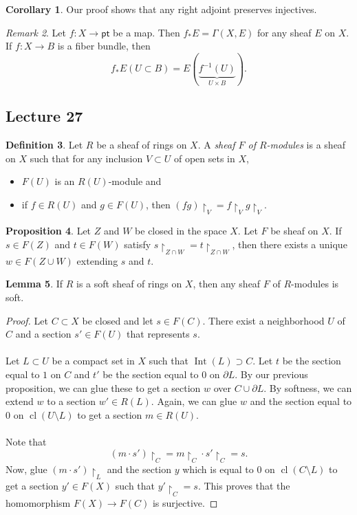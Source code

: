 \documentclass[10pt,letterpaper,cm]{nupset}
\theoremstyle{definition}
\newtheorem{definition}{Definition}[subsection]
\theoremstyle{theorem}
\newtheorem{lemma}[definition]{Lemma}
\newtheorem{prop}[definition]{Proposition}
\newtheorem{corollary}[definition]{Corollary}
\theoremstyle{remark}
\newtheorem{remark}[definition]{Remark}
\newcommand{\1}{\mathbb{1}}
\newcommand{\0}{\vec 0}
\newcommand{\pt}{\mathsf{pt}}
\DeclareMathOperator{\Int}{Int}
\DeclareMathOperator{\cl}{cl}
\begin{document}
\begin{corollary}
Our proof shows that any right adjoint preserves injectives. 
\end{corollary}

\begin{remark}
Let $f : X \to \pt$ be a map. Then $f_{\ast}{E} = \Gamma(X, E)$ for any sheaf $E$ on $X$. If $f : X \to B$ is a fiber bundle, then $$f_{\ast}{E}(U \subset B) = E(\underbrace{f^{-1}(U)}_{U \times B}).$$
\end{remark}

\subsection{Lecture 27}

\begin{definition}
Let $R$ be a sheaf of rings on $X$. A \textit{sheaf  $F$ of $R$-modules} is a sheaf on $X$ such that for any inclusion $V \subset U$ of open sets in $X$, 
\begin{itemize}
\item $F(U)$ is an $R(U)$-module and
\item if $f \in R(U)$ and $g \in F(U)$, then $(fg)\restriction_V = f\restriction_V g\restriction_V$.
\end{itemize}
\end{definition}


\begin{prop}
Let $Z$ and $W$ be closed in the space $X$. Let $F$ be sheaf on $X$. If $s\in F(Z)$ and $t \in F(W)$ satisfy $s \restriction_{Z \cap W} = t \restriction_{Z \cap W}$, then there exists a unique $w \in F(Z \cup W)$ extending $s$ and $t$.
\end{prop}

\begin{lemma}
If $R$ is a soft sheaf of rings on $X$, then any sheaf $F$ of $R$-modules is soft.
\end{lemma}
\begin{proof}
Let $C \subset X$ be closed and let $s \in F(C)$. There exist a neighborhood $U$ of $C$ and a section $s' \in F(U)$ that represents $s$. 
\\ \\
Let $L\subset U$ be a compact set in $X$ such that $\Int(L) \supset C$. Let $t$ be the section equal to $1$ on $C$ and $t'$ be the section equal to $0$ on $\partial{L}$. By our previous proposition, we can glue these to get a section $w$ over $C \cup \partial{L}$. By softness, we can extend $w$ to a section $w' \in R(L)$. Again, we can glue $w$ and the section equal to $0$ on $\cl(U \setminus L)$ to get a section $m\in R(U)$. 
\\ \\ Note that $$(m \cdot s') \restriction_C = m \restriction_C \cdot s' \restriction_C = s .$$ Now, glue $(m \cdot s') \restriction_L$ and the section $y$ which is equal to $0$ on $\cl(C \setminus L)$ to get a section $y'\in F(X)$ such that $y'\restriction_C = s$. This proves that the homomorphism $F(X) \to F(C)$ is surjective. 
\end{proof}
\end{document}
